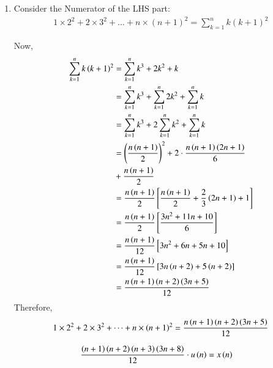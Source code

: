 \documentclass[journal,12pt,twocolumn]{IEEEtran}
\theoremstyle{remark}
\begin{document}
\begin{enumerate}[label=\arabic*.]
\item Consider the Numerator of the LHS part:
\begin{align}
    1\times2^2 + 2\times3^2 + \dots + n\times(n+1)^2 = \sum_{k=1}^n k(k+1)^2 
\end{align}

Now,
\begin{align}
    \sum_{k=1}^n k\left(k+1\right)^2 &= \sum_{k=1}^n k^3+2k^2+k\\
                          &=  \sum_{k=1}^n k^3 + \sum_{k=1}^n 2k^2 + \sum_{k=1}^n k\\
                          &=  \sum_{k=1}^n k^3 + 2\sum_{k=1}^n k^2 + \sum_{k=1}^n k\\
                          &= \left(\frac{n\left(n+1\right)}{2}\right)^{\scriptstyle 2} + 2\cdot \frac{n\left(n+1\right)\left(2n+1\right)}{6}\\  &+\frac{n\left(n+1\right)}{2}\notag \\
                          &= \frac{n\left(n+1\right)}{2}\left[\frac{n\left(n+1\right)}{2} + \frac{2}{3}\left(2n+1\right) + 1\right]\\
                          &= \frac{n\left(n+1\right)}{2}\left[\frac{3n^2 + 11n +10}{6}\right]\\
                          &= \frac{n\left(n+1\right)}{12}\left[3n^2 + 6n + 5n + 10\right]\\
                          &= \frac{n\left(n+1\right)}{12}\left[3n\left(n+2\right)+5\left(n+2\right)\right]\\
                          &= \frac{n\left(n+1\right)\left(n+2\right)\left(3n+5\right)}{12}
\end{align}
Therefore,
\begin{equation}
   1\times2^2 + 2\times3^2 + \dots + n\times\left(n+1\right)^2 = \frac{n\left(n+1\right)\left(n+2\right)\left(3n+5\right)}{12}   \\
\end{equation}



\begin{align}
\frac{\left(n+1\right)\left(n+2\right)\left(n+3\right)\left(3n+8\right)}{12}\cdot u\left(n\right) &= x\left(n\right)
\end{align}
    

\end{enumerate}
\end{document}
